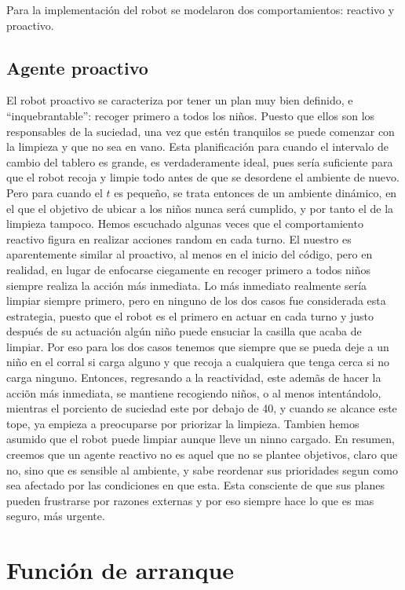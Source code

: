 \documentclass{llncs}
\begin{document}
Para la implementaci\'on del robot se modelaron dos comportamientos: reactivo y proactivo. 

\subsection{Agente proactivo}
El robot proactivo se caracteriza por tener un plan muy bien definido, e ``inquebrantable'': recoger primero a todos los ni\~nos.
Puesto que ellos son los responsables de la suciedad, una vez que est\'en tranquilos se puede comenzar con la limpieza y que no sea en vano. Esta planificaci\'on para cuando el intervalo de cambio del tablero es grande, es verdaderamente ideal, pues ser\'ia 
suficiente para que el robot recoja y limpie todo antes de que se desordene el ambiente de nuevo. Pero para cuando el $t$ es peque\~no, se trata entonces de un ambiente din\'amico, en el que el objetivo de ubicar a los
ni\~nos nunca ser\'a cumplido, y por tanto el de la limpieza tampoco. 
Hemos escuchado algunas veces que el comportamiento reactivo figura en realizar acciones 
random en cada turno. 
El nuestro es aparentemente similar al proactivo, al menos en el inicio del c\'odigo, pero en 
realidad, en lugar de enfocarse ciegamente en recoger
primero a todos ni\~nos siempre realiza la acci\'on m\'as inmediata. Lo m\'as inmediato realmente 
ser\'ia limpiar siempre primero, pero en ninguno de los dos
casos fue considerada esta estrategia, puesto que el robot es el primero en actuar en cada turno y justo 
despu\'es de su actuaci\'on alg\'un ni\~no puede ensuciar la casilla que
acaba de limpiar. Por eso para los dos casos tenemos que siempre que se pueda deje a un 
ni\~no en el corral si carga alguno y que recoja a cualquiera
que tenga cerca si no carga ninguno. Entonces, regresando a la reactividad, este adem\~as de 
hacer la acci\~on m\'as inmediata, se mantiene recogiendo ni\~nos,
o al menos intent\'andolo, mientras el porciento de suciedad este por debajo de 40, y cuando se 
alcance este tope, ya empieza a preocuparse por priorizar la limpieza.
Tambien hemos asumido que el robot puede limpiar aunque lleve un ninno cargado. En 
resumen, creemos que un agente reactivo no es aquel que no se plantee
objetivos, claro que no, sino que es sensible al ambiente, y sabe reordenar sus prioridades 
segun como sea afectado por las condiciones en que esta.
Esta consciente de que sus planes pueden frustrarse por razones externas y por eso siempre 
hace lo que es mas seguro, m\'as urgente.

\section{Funci\'on de arranque}
\end{document}
